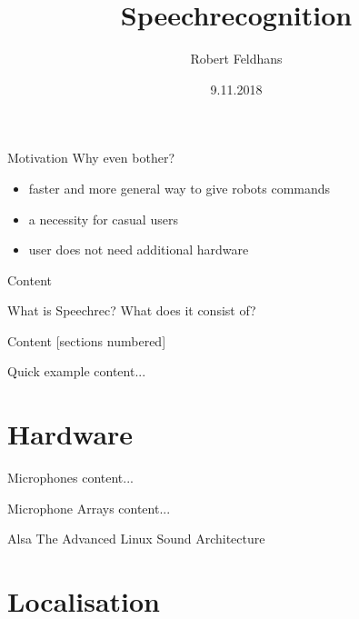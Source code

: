 \documentclass{beamer}
\title{Speechrecognition}
\date{9.11.2018}
\author{Robert Feldhans}
\institute{Seminar Robocup}
\begin{document}
	\maketitle
	
	\begin{frame}{Motivation}
		Why even bother?
		\begin{itemize}
			\item faster and more general way to give robots commands
			\item a necessity for casual users
			\item user does not need additional hardware
		\end{itemize}
	\end{frame}
	
	\begin{frame}{Content}
		
		\begin{alertblock}{What is Speechrec? What does it consist of?}
		\end{alertblock}
		
	\end{frame}
	
	\begin{frame}{Content}
		[sections numbered]
		\tableofcontents[hideallsubsections]
	\end{frame}
	
	\begin{frame}{Quick example}
		content...
	\end{frame}
	
	
	\section{Hardware}%
	
	\begin{frame}{Microphones}
		content...
	\end{frame}
	
	\begin{frame}{Microphone Arrays}
		content...
	\end{frame}
	
	\begin{frame}{Alsa}
		The Advanced Linux Sound Architecture
	\end{frame}
	
	\section{Localisation}%
	
\end{document}
